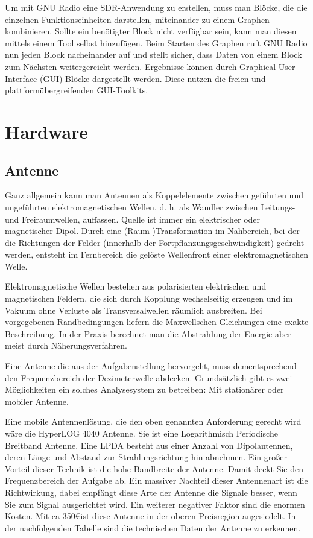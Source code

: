Um mit GNU Radio eine SDR-Anwendung zu erstellen, muss man Blöcke, die die einzelnen Funktionseinheiten darstellen, miteinander zu einem Graphen kombinieren. Sollte ein benötigter Block nicht verfügbar sein, kann man diesen mittels einem Tool selbst hinzufügen. Beim Starten des Graphen ruft GNU Radio nun jeden Block nacheinander auf und stellt sicher, dass Daten von einem Block zum Nächsten weitergereicht werden. Ergebnisse  können  durch  Graphical  User  Interface  (GUI)-Blöcke dargestellt werden. Diese nutzen die freien und plattformübergreifenden GUI-Toolkits.


\section{Hardware}

\subsection{Antenne} 

Ganz allgemein kann man Antennen als Koppelelemente zwischen geführten und ungeführten elektromagnetischen Wellen, d. h. als Wandler zwischen Leitungs- und Freiraumwellen, auffassen. Quelle ist immer ein elektrischer oder magnetischer Dipol. Durch eine (Raum-)Transformation im Nahbereich, bei der die Richtungen der Felder (innerhalb der Fortpflanzungsgeschwindigkeit) gedreht werden, entsteht im Fernbereich die gelöste Wellenfront einer elektromagnetischen Welle. 

Elektromagnetische Wellen bestehen aus polarisierten elektrischen und magnetischen Feldern, die sich durch Kopplung wechselseitig erzeugen und im Vakuum ohne Verluste als Transversalwellen räumlich ausbreiten. Bei vorgegebenen Randbedingungen liefern die Maxwellschen Gleichungen eine exakte Beschreibung. In der Praxis berechnet man die Abstrahlung der Energie aber meist durch Näherungsverfahren. 

Eine Antenne die aus der Aufgabenstellung hervorgeht, muss dementsprechend den Frequenzbereich der Dezimeterwelle abdecken. Grundsätzlich gibt es zwei Möglichkeiten ein solches Analysesystem zu betreiben: Mit stationärer oder mobiler Antenne.

Eine mobile Antennenlösung, die den oben genannten Anforderung gerecht wird wäre die HyperLOG 4040 Antenne. Sie ist eine Logarithmisch Periodische Breitband Antenne. Eine LPDA besteht aus einer Anzahl von Dipolantennen, deren Länge und Abstand zur Strahlungsrichtung hin abnehmen. Ein großer Vorteil dieser Technik ist die hohe Bandbreite der Antenne. Damit deckt Sie den Frequenzbereich der Aufgabe ab. Ein massiver Nachteil dieser Antennenart ist die Richtwirkung, dabei empfängt diese Arte der Antenne die Signale besser, wenn Sie zum Signal ausgerichtet wird. Ein weiterer negativer Faktor sind die enormen Kosten. Mit ca 350\euro ist diese Antenne in der oberen Preisregion angesiedelt. In der nachfolgenden Tabelle sind die technischen Daten der Antenne zu erkennen. 


